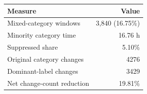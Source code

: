 \begin{tabular}{lr}
\hline
Measure & Value \\
\hline
Mixed-category windows & 3,840 (16.75\%) \\
Minority category time & 16.76 h \\
Suppressed share & 5.10\% \\
Original category changes & 4276 \\
Dominant-label changes & 3429 \\
Net change-count reduction & 19.81\% \\
\hline
\end{tabular}
